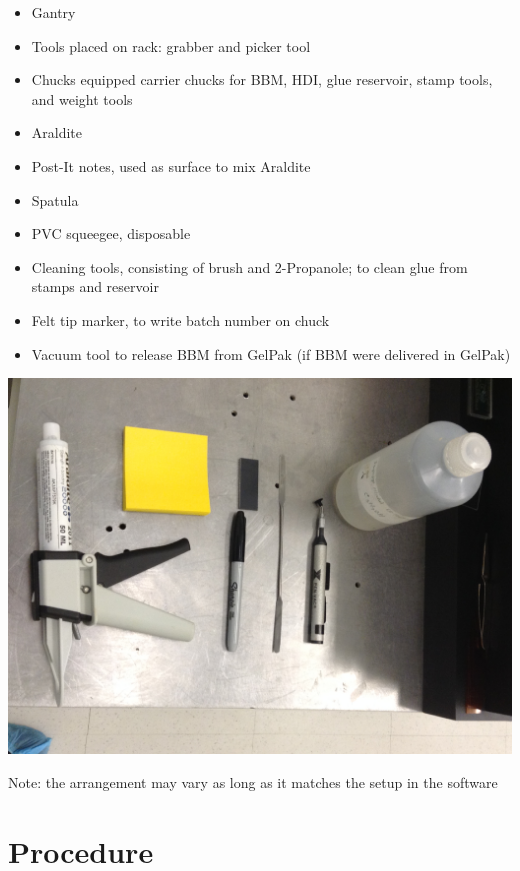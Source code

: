 \documentclass[12pt]{unlsilabsop}
\begin{document}
\begin{itemize}
    \item Gantry
    \item Tools placed on rack: grabber and picker tool
    \item Chucks equipped carrier chucks for BBM, HDI, glue reservoir, stamp tools, and weight tools
    \item Araldite
    \item Post-It notes, used as surface to mix Araldite
    \item Spatula
    \item PVC squeegee, disposable
    \item Cleaning tools, consisting of brush and 2-Propanole; to clean glue from stamps and reservoir
    \item Felt tip marker, to write batch number on chuck
    \item Vacuum tool to release BBM from GelPak (if BBM were delivered in GelPak)
\end{itemize}
\begin{center}
\includegraphics[scale = 0.3]{materials}
\end{center}


Note: the arrangement may vary as long as it matches the setup in the software

\section{Procedure}
\end{document}
